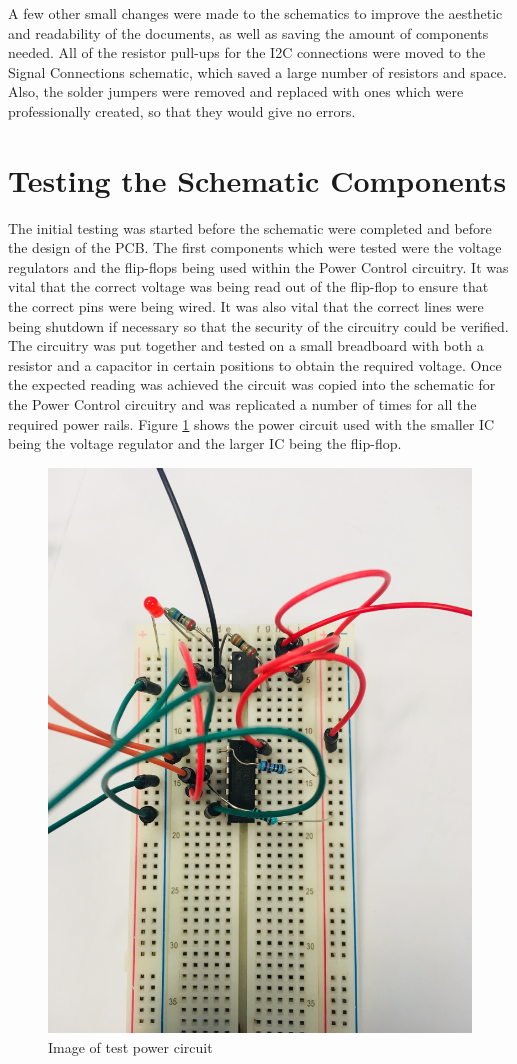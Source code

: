 A few other small changes were made to the schematics to improve the aesthetic and readability of the documents, as well as saving the amount of components needed. All of the resistor pull-ups for the I2C connections were moved to the Signal Connections schematic, which saved a large number of resistors and space. Also, the solder jumpers were removed and replaced with ones which were professionally created, so that they would give no errors.


\section{Testing the Schematic Components}
\label{chap6sec2}

The initial testing was started before the schematic were completed and before the design of the PCB. The first components which were tested were the voltage regulators and the flip-flops being used within the Power Control circuitry. It was vital that the correct voltage was being read out of the flip-flop to ensure that the correct pins were being wired. It was also vital that the correct lines were being shutdown if necessary so that the security of the circuitry could be verified. The circuitry was put together and tested on a small breadboard with both a resistor and a capacitor in certain positions to obtain the required voltage. Once the expected reading was achieved the circuit was copied into the schematic for the Power Control circuitry and was replicated a number of times for all the required power rails. Figure \ref{fig:power_circuit} shows the power circuit used with the smaller IC being the voltage regulator and the larger IC being the flip-flop.

\begin{figure}
	\includegraphics[width=0.5\linewidth]{Figures/powercircuit.jpg}\centering
	\caption{Image of test power circuit}
	\label{fig:power_circuit}
\end{figure}


